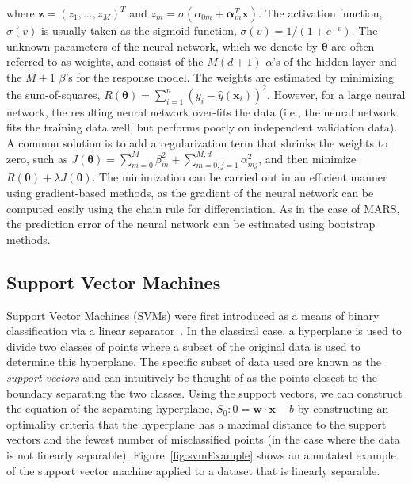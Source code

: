 where $\mathbf{z} = (z_1, \dots, z_M)^T$ and $z_m = \sigma(\alpha_{0m} + \boldsymbol{\alpha}_m^T \mathbf{x})$.
%
The activation function, $\sigma(v)$ is usually taken as the sigmoid function, $\sigma(v) = 1/(1+e^{-v})$.
%
The unknown parameters of the neural network, which we denote by $\boldsymbol{\theta}$ are often referred to as weights, and consist of the $M(d+1)$ $\alpha$'s of the hidden layer and the $M+1$ $\beta$'s for the response model.
%
The weights are estimated by minimizing the sum-of-squares, $R(\boldsymbol{\theta}) = \sum_{i=1}^n (y_i - \hat{y}(\mathbf{x}_i))^2$.
%
However, for a large neural network, the resulting neural network over-fits the data (i.e., the neural network fits the training data well, but performs poorly on independent validation data).
%
A common solution is to add a regularization term that shrinks the weights to zero, such as $J(\boldsymbol{\theta}) = \sum_{m=0}^M \beta_{m}^2 + \sum_{m=0,j=1}^{M,d} \alpha_{mj}^2$, and then minimize $R(\boldsymbol{\theta}) + \lambda J(\boldsymbol{\theta})$.
%
The minimization can be carried out in an efficient manner using gradient-based methods, as the gradient of the neural network can be computed easily using the chain rule for differentiation.
%
As in the case of MARS, the prediction error of the neural network can be estimated using bootstrap methods.


\subsection{Support Vector Machines}

Support Vector Machines (SVMs) were first introduced as a means of binary classification via a linear separator~\cite{VapnikLerner1963}.
%
In the classical case, a hyperplane is used to divide two classes of points where a subset of the original data is used to determine this hyperplane.
%
The specific subset of data used are known as the \emph{support vectors} and can intuitively be thought of as the points closest to the boundary separating the two classes.
%
Using the support vectors, we can construct the equation of the separating hyperplane, $S_0: 0 = \mathbf{w} \cdot \mathbf{x} - b$ by constructing an optimality criteria that the hyperplane has a maximal distance to the support vectors and the fewest number of misclassified points (in the case where the data is not linearly separable).
%
Figure~\ref{fig:svmExample} shows an annotated example of the support vector machine applied to a dataset that is linearly separable.

